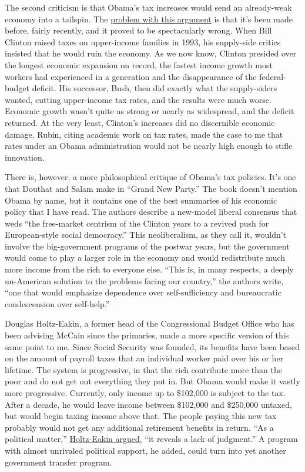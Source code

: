 The second criticism is that Obama's tax increases would send an
already-weak economy into a tailspin. The
\href{http://wsj.com/article/SB121728762442091427.html}{problem with
this argument} is that it's been made before, fairly recently, and it
proved to be spectacularly wrong. When Bill Clinton raised taxes on
upper-income families in 1993, his supply-side critics insisted that he
would ruin the economy. As we now know, Clinton presided over the
longest economic expansion on record, the fastest income growth most
workers had experienced in a generation and the disappearance of the
federal-budget deficit. His successor, Bush, then did exactly what the
supply-siders wanted, cutting upper-income tax rates, and the results
were much worse. Economic growth wasn't quite as strong or nearly as
widespread, and the deficit returned. At the very least, Clinton's
increases did no discernible economic damage. Rubin, citing academic
work on tax rates, made the case to me that rates under an Obama
administration would not be nearly high enough to stifle innovation.

There is, however, a more philosophical critique of Obama's tax
policies. It's one that Douthat and Salam make in ``Grand New Party.''
The book doesn't mention Obama by name, but it contains one of the best
summaries of his economic policy that I have read. The authors describe
a new-model liberal consensus that weds ``the free-market centrism of
the Clinton years to a revived push for European-style social
democracy.'' This neoliberalism, as they call it, wouldn't involve the
big-government programs of the postwar years, but the government would
come to play a larger role in the economy and would redistribute much
more income from the rich to everyone else. ``This is, in many respects,
a deeply un-American solution to the problems facing our country,'' the
authors write, ``one that would emphasize dependence over
self-sufficiency and bureaucratic condescension over self-help.''

Douglas Holtz-Eakin, a former head of the Congressional Budget Office
who has been advising McCain since the primaries, made a more specific
version of this same point to me. Since Social Security was founded, its
benefits have been based on the amount of payroll taxes that an
individual worker paid over his or her lifetime. The system is
progressive, in that the rich contribute more than the poor and do not
get out everything they put in. But Obama would make it vastly more
progressive. Currently, only income up to \$102,000 is subject to the
tax. After a decade, he would leave income between \$102,000 and
\$250,000 untaxed, but would begin taxing income above that. The people
paying this new tax probably would not get any additional retirement
benefits in return. ``As a political matter,''
\href{http://www.leighbureau.com/speaker.asp?id=344}{Holtz-Eakin
argued}, ``it reveals a lack of judgment.'' A program with almost
unrivaled political support, he added, could turn into yet another
government transfer program.

